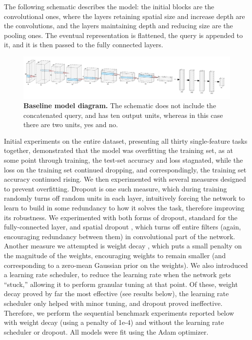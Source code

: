 The following schematic describes the model: the initial blocks are the convolutional ones, where the layers retaining spatial size and increase depth are the convolutions, and the layers maintaining depth and reducing size are the pooling ones. The eventual representation is flattened, the query is appended to it, and it is then passed to the fully connected layers.
\begin{figure}[!htb]
\centering
\includegraphics[width=\linewidth]{ch-models-compared/figures/baseline.png}
\caption{{\bf Baseline model diagram.} The schematic does not include the concatenated query, and has ten output units, whereas in this case there are two units, yes and no. }
\label{fig:baseline-model-diagram}
\end{figure}

Initial experiments on the entire dataset, presenting all thirty single-feature tasks together, demonstrated that the model was overfitting the training set, as at some point through training, the test-set accuracy and loss stagnated, while the loss on the training set continued dropping, and correspondingly, the training set accuracy continued rising. We then experimented with several measures designed to prevent overfitting. Dropout is one such measure, which during training randomly turns off random units in each layer, intuitively forcing the network to learn to build in some redundancy to how it solves the task, therefore improving its robustness. We experimented with both forms of dropout, standard \parencite{Srivastava2014} for the fully-connected layer, and spatial dropout \parencite{Tompson2015}, which turns off entire filters (again, encouraging redundancy between them) in convolutional part of the network. Another measure we attempted is weight decay \parencite{Krogh1992}, which puts a small penalty on the magnitude of the weights, encouraging weights to remain smaller (and corresponding to a zero-mean Gaussian prior on the weights). We also introduced a learning rate scheduler, to reduce the learning rate when the network gets “stuck,” allowing it to perform granular tuning at that point. Of these, weight decay proved by far the most effective (see results below), the learning rate scheduler only helped with minor tuning, and dropout proved ineffective. Therefore, we perform the sequential benchmark experiments reported below with weight decay (using a penalty of 1e-4) and without the learning rate scheduler or dropout. All models were fit using the Adam \parencite{Kingma2015} optimizer.